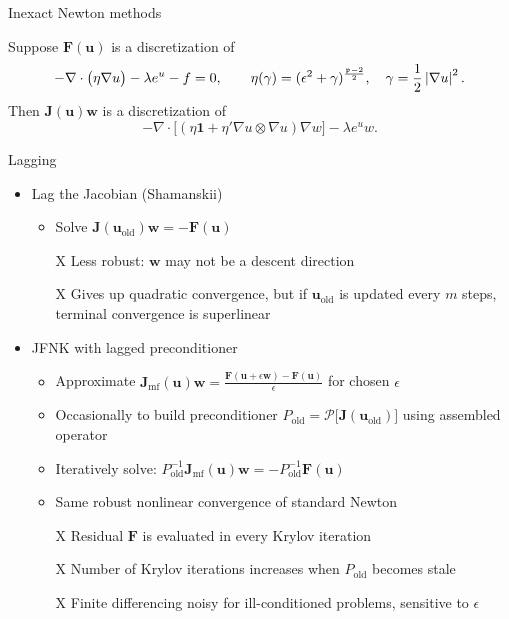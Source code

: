 \documentclass{beamer}
\newcommand{\vu}{\mathbf{u}}
\newcommand{\vw}{\mathbf{w}}
\newcommand{\vF}{\mathbf{F}}
\newcommand{\vJ}{\mathbf{J}}
\begin{document}
\begin{frame}{Inexact Newton methods}
  \begin{example}
    Suppose $\vF(\vu)$ is a discretization of \vspace{-1em}
    \[ -\nabla \cdot \big( \eta \nabla u \big) - \lambda e^u - f = 0, \qquad \eta(\gamma) = (\epsilon^2+\gamma)^{\frac{{\mathfrak p}-2}{2}}, \quad \gamma = {\frac 1 2} \left\lvert \nabla u \right\rvert^2 . \]
    Then $\vJ(\vu)\vw$ is a discretization of  \vspace{-1em}
    \[ -\nabla \cdot \big[ (\eta \bm 1 + \eta' \nabla u \otimes \nabla u) \nabla w \big] - \lambda e^{u} w . \]
  \end{example}
\end{frame}



\begin{frame}{Lagging}
  \begin{itemize}
  \item Lag the Jacobian (Shamanskii)
    \begin{itemize}
    \item Solve $\vJ(\vu_{\text{old}}) \vw = - \vF(\vu)$
    \item[X] Less robust: $\vw$ may not be a descent direction
    \item[X] Gives up quadratic convergence, but if $\vu_{\text{old}}$ is updated every $m$ steps, terminal convergence is superlinear
    \end{itemize}
  \item JFNK with lagged preconditioner
    \begin{itemize}
    \item Approximate $\vJ_{\text{mf}}(\vu)\vw = \frac{\vF(\vu+\epsilon \vw) - \vF(\vu)}{\epsilon}$ for chosen $\epsilon$
    \item Occasionally to build preconditioner $P_{\text{old}} = \mathcal{P}\big[\vJ(\vu_{\text{old}})\big]$ using assembled operator
    \item Iteratively solve: $P_{\text{old}}^{-1} \vJ_{\text{mf}}(\vu) \vw = - P_{\text{old}}^{-1} \vF(\vu)$
    \item Same robust nonlinear convergence of standard Newton
    \item[X] Residual $\vF$ is evaluated in every Krylov iteration
    \item[X] Number of Krylov iterations increases when $P_{\text{old}}$ becomes stale
    \item[X] Finite differencing noisy for ill-conditioned problems, sensitive to $\epsilon$
    \end{itemize}
  \end{itemize}
\end{frame}
\end{document}

